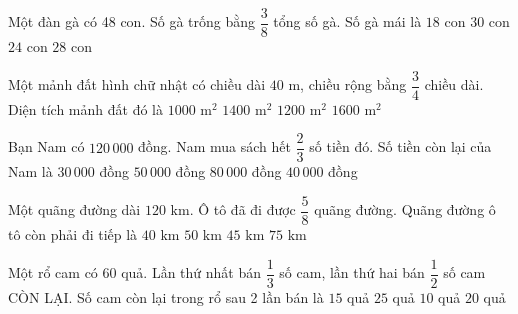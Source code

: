 \begin{ex} %
Một đàn gà có 48 con. Số gà trống bằng $\dfrac{3}{8}$ tổng số gà. Số gà mái là
\choice
{$18$ con}
{\True $30$ con}
{$24$ con}
{$28$ con}
\end{ex}

\begin{ex} %
Một mảnh đất hình chữ nhật có chiều dài $40\text{ m}$, chiều rộng bằng $\dfrac{3}{4}$ chiều dài. Diện tích mảnh đất đó là
\choice
{$1000\text{ m}^2$}
{$1400\text{ m}^2$}
{\True $1200\text{ m}^2$}
{$1600\text{ m}^2$}
\end{ex}

\begin{ex} %
Bạn Nam có $120\,000$ đồng. Nam mua sách hết $\dfrac{2}{3}$ số tiền đó. Số tiền còn lại của Nam là
\choice
{$30\,000$ đồng}
{$50\,000$ đồng}
{$80\,000$ đồng}
{\True $40\,000$ đồng}
\end{ex}

\begin{ex} %
Một quãng đường dài $120\text{ km}$. Ô tô đã đi được $\dfrac{5}{8}$ quãng đường. Quãng đường ô tô còn phải đi tiếp là
\choice
{$40\text{ km}$}
{$50\text{ km}$}
{\True $45\text{ km}$}
{$75\text{ km}$}
\end{ex}

\begin{ex} %
Một rổ cam có 60 quả. Lần thứ nhất bán $\dfrac{1}{3}$ số cam, lần thứ hai bán $\dfrac{1}{2}$ số cam CÒN LẠI. Số cam còn lại trong rổ sau 2 lần bán là
\choice
{$15$ quả}
{$25$ quả}
{$10$ quả}
{\True $20$ quả}
\end{ex}

